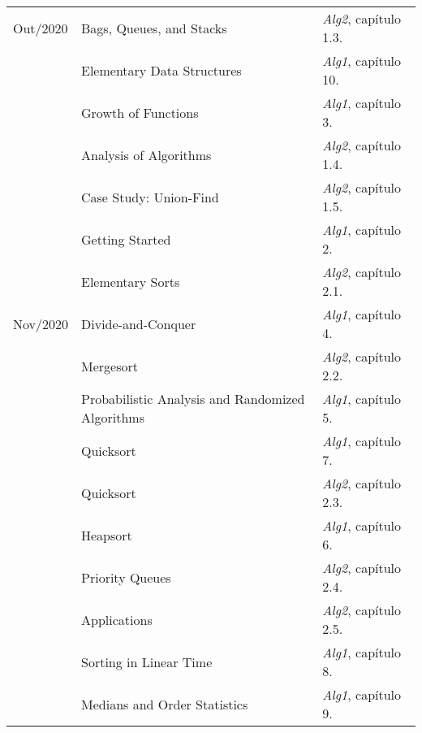 \documentclass[a4paper]{inzane_syllabus} %
\begin{document}
\begin{center}
\begin{tabularx}{\textwidth}{p{2cm}p{8cm}p{9.5cm}}
\arrayrulecolor{maingray}\hline
Out/2020 & Bags, Queues, and Stacks   & \emph{Alg2}, capítulo 1.3. \\
         & Elementary Data Structures & \emph{Alg1}, capítulo 10.  \\
         & Growth of Functions        & \emph{Alg1}, capítulo 3.   \\
         & Analysis of Algorithms     & \emph{Alg2}, capítulo 1.4. \\
         & Case Study: Union-Find     & \emph{Alg2}, capítulo 1.5. \\
         & Getting Started            & \emph{Alg1}, capítulo 2.   \\
         & Elementary Sorts           & \emph{Alg2}, capítulo 2.1. \\

\arrayrulecolor{maingray}\hline
Nov/2020 & Divide-and-Conquer                                & \emph{Alg1}, capítulo 4.   \\
         & Mergesort                                         & \emph{Alg2}, capítulo 2.2. \\
         & Probabilistic Analysis and Randomized Algorithms  & \emph{Alg1}, capítulo 5.   \\
         & Quicksort                                         & \emph{Alg1}, capítulo 7.   \\
         & Quicksort                                         & \emph{Alg2}, capítulo 2.3. \\
         & Heapsort                                          & \emph{Alg1}, capítulo 6.   \\
         & Priority Queues                                   & \emph{Alg2}, capítulo 2.4. \\
         & Applications                                      & \emph{Alg2}, capítulo 2.5. \\
         & Sorting in Linear Time                            & \emph{Alg1}, capítulo 8.   \\
         & Medians and Order Statistics                      & \emph{Alg1}, capítulo 9.   \\
         

\end{tabularx}
\end{center}
\end{document}
